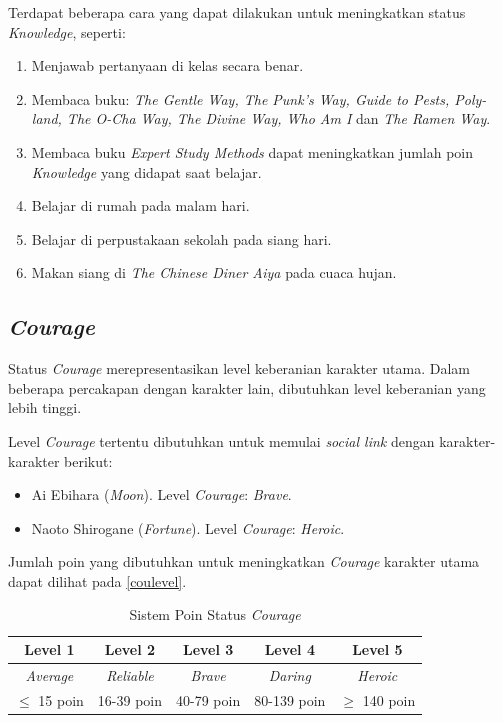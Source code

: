 Terdapat beberapa cara yang dapat dilakukan untuk meningkatkan status \textit{Knowledge}, seperti:
\begin{enumerate}
    \item Menjawab pertanyaan di kelas secara benar. %
    \item Membaca buku: \textit{The Gentle Way, The Punk’s Way, Guide to Pests, Poly-land, The O-Cha Way, The Divine Way, Who Am I} dan \textit{The Ramen Way}. %
    \item Membaca buku \textit{Expert Study Methods} dapat meningkatkan jumlah poin \textit{Knowledge} yang didapat saat belajar.
    \item Belajar di rumah pada malam hari. %
    \item Belajar di perpustakaan sekolah pada siang hari.  %
    \item Makan siang di \textit{The Chinese Diner Aiya} pada cuaca hujan.
\end{enumerate}

\subsection{\textit{Courage}}
Status \textit{Courage} merepresentasikan level keberanian karakter utama. Dalam beberapa percakapan dengan karakter lain, dibutuhkan level keberanian yang lebih tinggi.

Level \textit{Courage} tertentu dibutuhkan untuk memulai \textit{social link} dengan karakter-karakter berikut:
\begin{itemize}
    \item Ai Ebihara (\textit{Moon}). Level \textit{Courage}: \textit{Brave}.
    \item Naoto Shirogane (\textit{Fortune}). Level \textit{Courage}: \textit{Heroic}.
\end{itemize}

Jumlah poin yang dibutuhkan untuk meningkatkan \textit{Courage} karakter utama dapat dilihat pada \autoref{coulevel}.
\begin{table}[H]
    \caption{\label{coulevel}Sistem Poin Status \textit{Courage}}
    \begin{center}
        \begin{tabular}{ | c | c | c | c | c | }
            \hline
            \textbf{Level 1} & \textbf{Level 2}  & \textbf{Level 3} & \textbf{Level 4} & \textbf{Level 5} \\
            \hline
            \textit{Average} & \textit{Reliable} & \textit{Brave}   & \textit{Daring}  & \textit{Heroic}  \\
            \hline
            $\le$ 15 poin    & 16-39 poin        & 40-79 poin       & 80-139 poin      & $\ge$ 140 poin   \\
            \hline
        \end{tabular}
    \end{center}
\end{table}

